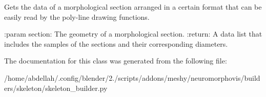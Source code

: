 \begin{DoxyVerb}Gets the data of a morphological section arranged in a certain format that can be easily
read by the poly-line drawing functions.

:param section: The geometry of a morphological section.
:return: A data list that includes the samples of the sections and their corresponding
diameters.
\end{DoxyVerb}
 

The documentation for this class was generated from the following file\+:\begin{DoxyCompactItemize}
\item 
/home/abdellah/.\+config/blender/2./scripts/addons/meshy/neuromorphovis/builders/skeleton/skeleton\+\_\+builder.\+py\end{DoxyCompactItemize}

